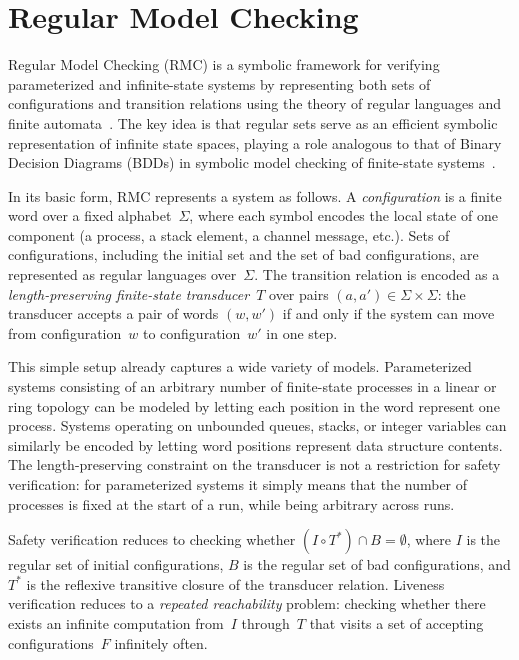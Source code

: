 \section{Regular Model Checking}

Regular Model Checking (RMC) is a symbolic framework for verifying
parameterized and infinite-state systems by representing both sets of
configurations and transition relations using the theory of regular languages
and finite automata~\cite{KW01,BW98}. The key idea is that regular sets serve
as an efficient symbolic representation of infinite state spaces, playing a
role analogous to that of Binary Decision Diagrams (BDDs) in symbolic model
checking of finite-state systems~\cite{Abd10}.

In its basic form, RMC represents a system as follows. A \emph{configuration}
is a finite word over a fixed alphabet~$\Sigma$, where each symbol encodes the
local state of one component (a process, a stack element, a channel message,
etc.). Sets of configurations, including the initial set and the set of bad
configurations, are represented as regular languages over~$\Sigma$. The
transition relation is encoded as a \emph{length-preserving finite-state
transducer}~$T$ over pairs $(a, a') \in \Sigma \times \Sigma$: the transducer
accepts a pair of words $(w, w')$ if and only if the system can move from
configuration~$w$ to configuration~$w'$ in one step.

This simple setup already captures a wide variety of models. Parameterized
systems consisting of an arbitrary number of finite-state processes in a
linear or ring topology can be modeled by letting each position in the word
represent one process. Systems operating on unbounded queues, stacks, or
integer variables can similarly be encoded by letting word positions represent
data structure contents. The length-preserving constraint on the transducer is
not a restriction for safety verification: for parameterized systems it simply
means that the number of processes is fixed at the start of a run, while
being arbitrary across runs.

Safety verification reduces to checking whether $(I \circ T^*) \cap B =
\emptyset$, where $I$ is the regular set of initial configurations, $B$ is
the regular set of bad configurations, and $T^*$ is the reflexive transitive
closure of the transducer relation. Liveness verification reduces to a
\emph{repeated reachability} problem: checking whether there exists an
infinite computation from~$I$ through~$T$ that visits a set of accepting
configurations~$F$ infinitely often.


